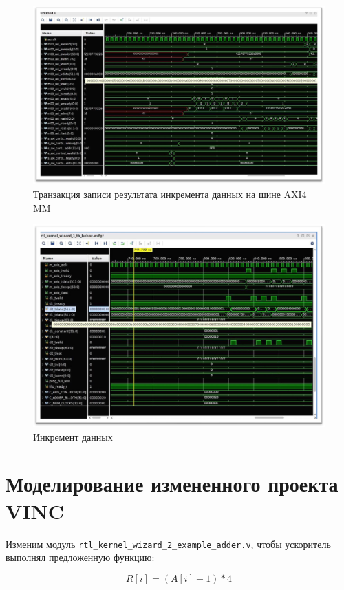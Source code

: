\begin{figure}[ht]
	\centering
	\includegraphics[width=\linewidth]{img/inc-2.png}
	\caption{Транзакция записи результата инкремента данных на шине AXI4
MM}
\end{figure}

\begin{figure}[ht]
	\centering
	\includegraphics[width=\linewidth]{img/inc-3.png}
	\caption{Инкремент данных}
\end{figure}

\chapter{Моделирование измененного проекта VINC}

Изменим модуль \texttt{rtl\_kernel\_wizard\_2\_example\_adder.v}, чтобы
ускоритель выполнял предложенную функцию:

\begin{equation}
	R[i] = (A[i] - 1) * 4
\end{equation}

